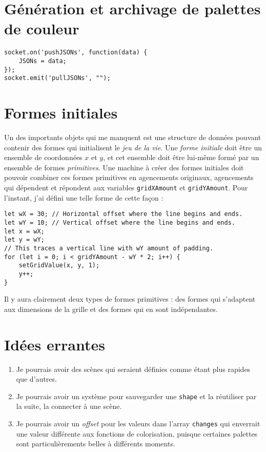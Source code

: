\newpage
\section{Génération et archivage de palettes de couleur}
\begin{lstlisting}
socket.on('pushJSONs', function(data) {
    JSONs = data;
});
socket.emit('pullJSONs', "");
\end{lstlisting}

\section{Formes initiales}
\noindent Un des importants objets qui me manquent est une structure de données pouvant contenir des formes qui initialisent le \textit{jeu de la vie}. Une \textit{forme initiale} doit être un ensemble de coordonnées $x$ et $y$, et cet ensemble doit être lui-même formé par un ensemble de formes \textit{primitives}. Une machine à créer des formes initiales doit pouvoir combiner ces formes primitives en agencements originaux, agencements qui dépendent et répondent aux variables \lstinline|gridXAmount| et \lstinline|gridYAmount|. Pour l'instant, j'ai défini une telle forme de cette façon :
\begin{lstlisting}
let wX = 30; // Horizontal offset where the line begins and ends.
let wY = 10; // Vertical offset where the line begins and ends.
let x = wX;
let y = wY;
// This traces a vertical line with wY amount of padding.
for (let i = 0; i < gridYAmount - wY * 2; i++) {
    setGridValue(x, y, 1);
    y++;
}
\end{lstlisting}
\noindent Il y aura clairement deux types de formes primitives : des formes qui s'adaptent aux dimensions de la grille et des formes qui en sont indépendantes.

\newpage
\section{Idées errantes}
\begin{enumerate}
\item Je pourrais avoir des scènes qui seraient définies comme étant plus rapides que d'autres. 
\item Je pourrais avoir un système pour sauvegarder une \lstinline|shape| et la réutiliser par la suite, la connecter à une scène. 
\item Je pourrais avoir un \textit{offset} pour les valeurs dans l'array \lstinline|changes| qui enverrait une valeur différente aux fonctions de colorisation, puisque certaines palettes sont particulièrements belles à différents moments.
\end{enumerate}

